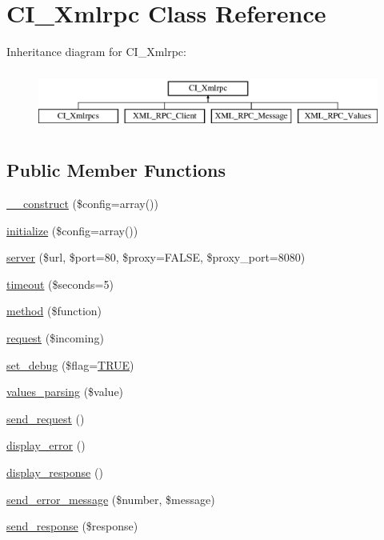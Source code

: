 \hypertarget{class_c_i___xmlrpc}{}\section{C\+I\+\_\+\+Xmlrpc Class Reference}
\label{class_c_i___xmlrpc}
Inheritance diagram for C\+I\+\_\+\+Xmlrpc\+:\begin{figure}[H]
\begin{center}
\leavevmode
\includegraphics[height=2.000000cm]{class_c_i___xmlrpc}
\end{center}
\end{figure}
\subsection*{Public Member Functions}
\begin{DoxyCompactItemize}
\item 
\mbox{\hyperlink{class_c_i___xmlrpc_af7f9493844d2d66e924e3c1df51ce616}{\+\_\+\+\_\+construct}} (\$config=array())
\item 
\mbox{\hyperlink{class_c_i___xmlrpc_a481385e36d920f5a5005ace05c6cd016}{initialize}} (\$config=array())
\item 
\mbox{\hyperlink{class_c_i___xmlrpc_a9969815a7195f6915eb73afcab3f9e9e}{server}} (\$url, \$port=80, \$proxy=F\+A\+L\+SE, \$proxy\+\_\+port=8080)
\item 
\mbox{\hyperlink{class_c_i___xmlrpc_ada3149e6290a7991c7dfc88c6c90f2db}{timeout}} (\$seconds=5)
\item 
\mbox{\hyperlink{class_c_i___xmlrpc_a3d7e090549ec52eba8cf65598eefa72c}{method}} (\$function)
\item 
\mbox{\hyperlink{class_c_i___xmlrpc_a10d4ec842c61f2301ecccc900500e4c8}{request}} (\$incoming)
\item 
\mbox{\hyperlink{class_c_i___xmlrpc_a277e289843ab2ff13a12441e1dd5cd37}{set\+\_\+debug}} (\$flag=\mbox{\hyperlink{constants_8php_ae04a3efe6aa42044f803ee90c2277846}{T\+R\+UE}})
\item 
\mbox{\hyperlink{class_c_i___xmlrpc_ae22fc267af5ff6330cb47172c78cc2c8}{values\+\_\+parsing}} (\$value)
\item 
\mbox{\hyperlink{class_c_i___xmlrpc_ad6f2431aec35ca073f3bdac3f0e8c66a}{send\+\_\+request}} ()
\item 
\mbox{\hyperlink{class_c_i___xmlrpc_adf0d809d39e17bc0e08387436db31386}{display\+\_\+error}} ()
\item 
\mbox{\hyperlink{class_c_i___xmlrpc_a3a8aedc2a1e6a67ad248dc6078ce8614}{display\+\_\+response}} ()
\item 
\mbox{\hyperlink{class_c_i___xmlrpc_a024ae8a44e09995c6d0b6cb50d8abd9a}{send\+\_\+error\+\_\+message}} (\$number, \$message)
\item 
\mbox{\hyperlink{class_c_i___xmlrpc_ac567feb54a4bda4cad24ff63d09267a1}{send\+\_\+response}} (\$response)
\end{DoxyCompactItemize}
